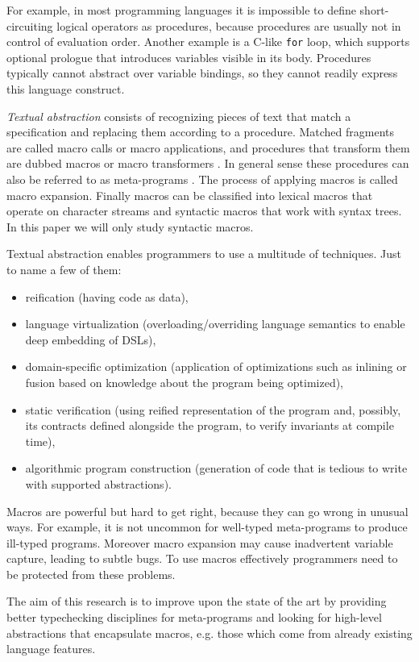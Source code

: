\documentclass[10pt,journal,a4paper]{IEEEtran}
\begin{document}
For example, in most programming languages it is impossible to define short-circuiting logical operators
as procedures, because procedures are usually not in control of evaluation order.
Another example is a C-like \small \texttt{for} \normalsize loop, which supports
optional prologue that introduces variables visible in its body. Procedures typically cannot abstract
over variable bindings, so they cannot readily express this language construct.

\emph{Textual abstraction} consists of recognizing pieces of text
that match a specification and replacing them according
to a procedure.
Matched fragments are called macro calls or macro applications, and
procedures that transform them are dubbed macros or macro transformers \cite{kohlbecker86}.
In general sense these procedures can also be referred to as meta-programs \cite{sheard01}.
The process of applying macros is called macro expansion.
Finally macros can be classified into lexical macros that
operate on character streams and syntactic macros that work with syntax trees.
In this paper we will only study syntactic macros.

Textual abstraction enables programmers to use a multitude of techniques.
Just to name a few of them:
\begin{itemize}
\item reification (having code as data),
\item language virtualization (overloading/overriding language semantics
to enable deep embedding of DSLs),
\item domain-specific optimization (application of optimizations such as inlining
or fusion based on knowledge about the program being optimized),
\item static verification (using reified representation of the program
and, possibly, its contracts defined alongside the program, to verify invariants
at compile time),
\item algorithmic program construction (generation of code that is tedious to write with
supported abstractions).
\end{itemize}

Macros are powerful but hard to get right, because they can go wrong in unusual ways.
For example, it is not uncommon for well-typed meta-programs to produce ill-typed programs.
Moreover macro expansion may cause inadvertent variable capture, leading to
subtle bugs. To use macros effectively programmers need to be protected from these problems.

The aim of this research is to improve upon the state of the art by providing better typechecking
disciplines for meta-programs and looking for high-level abstractions that encapsulate macros,
e.g. those which come from already existing language features.
\end{document}

